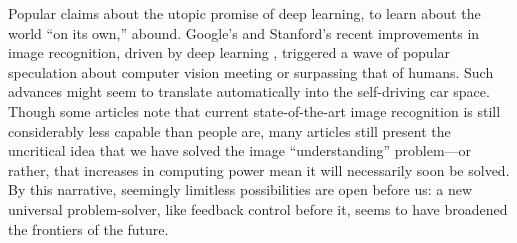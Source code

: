 Popular claims
about the utopic promise of deep learning, to
learn about the world ``on its own,''
abound. Google's and Stanford's recent
improvements in image recognition, driven by deep learning
\cite{markoffImage}, triggered a wave 
of popular speculation about computer vision meeting or surpassing
that of humans. Such
advances might seem to translate automatically into the self-driving
car space. Though some articles note that current
state-of-the-art image recognition is still considerably less capable
than people are, many articles still present the uncritical idea that we have solved
the image ``understanding'' problem---or rather, that increases in computing
power mean it will necessarily soon be solved. By this narrative, seemingly limitless
possibilities are open before us: a new universal problem-solver, like
feedback control before it, seems to have broadened the frontiers
of the future. 



